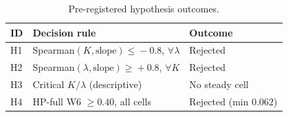 \begin{table}[!t]
 \caption{Pre-registered hypothesis outcomes.}
 \label{tab:hypotheses}
 \centering
 \small
 \setlength{\tabcolsep}{4pt}
 \begin{tabular}{@{}p{0.5cm}p{4.5cm}p{2.6cm}@{}}
 \toprule
 \textbf{ID} & \textbf{Decision rule} & \textbf{Outcome} \\
 \midrule
 H1 & Spearman$(K, \text{slope})\!\leq\!-0.8$, $\forall\lambda$ & Rejected \\
 H2 & Spearman$(\lambda, \text{slope})\!\geq\!+0.8$, $\forall K$ & Rejected \\
 H3 & Critical $K/\lambda$ (descriptive) & No steady cell \\
 H4 & HP-full W6 $\geq 0.40$, all cells & Rejected (min $0.062$) \\
 \bottomrule
 \end{tabular}
\end{table}
